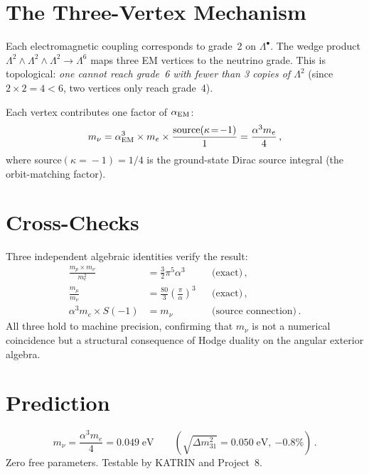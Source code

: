 \documentclass[11pt,letterpaper]{article}
\numberwithin{equation}{section}
\begin{document}
\section{The Three-Vertex Mechanism}

Each electromagnetic coupling corresponds to grade~2 on
$\Lambda^\bullet$.  The wedge product
$\Lambda^2 \wedge \Lambda^2 \wedge \Lambda^2 \to \Lambda^6$ maps
three EM vertices to the neutrino grade.  This is topological:
\emph{one cannot reach grade~6 with fewer than 3 copies of
$\Lambda^2$} (since $2 \times 2 = 4 < 6$, two vertices only reach
grade~4).

Each vertex contributes one factor of $\alpha_{\rm EM}$:
\begin{equation}
  m_\nu = \alpha_{\rm EM}^3 \times m_e \times
  \frac{\text{source}(\kappa\!=\!-1)}{1}
  = \frac{\alpha^3 m_e}{4}\,,
\end{equation}
where source$(\kappa\!=\!-1) = 1/4$ is the ground-state Dirac source
integral (the orbit-matching factor).

\section{Cross-Checks}

Three independent algebraic identities verify the result:
\begin{align}
  \frac{m_p \times m_\nu}{m_e^2}
  &= \frac{3}{2}\pi^5 \alpha^3 &&\text{(exact)}\,,\\
  \frac{m_\mu}{m_\nu}
  &= \frac{80}{3}\left(\frac{\pi}{\alpha}\right)^{\!3}
  &&\text{(exact)}\,,\\
  \alpha^3 m_e \times S(-1)
  &= m_\nu &&\text{(source connection)}\,.
\end{align}
All three hold to machine precision, confirming that $m_\nu$ is not a
numerical coincidence but a structural consequence of Hodge duality on
the angular exterior algebra.

\section{Prediction}

\begin{equation}
  m_\nu = \frac{\alpha^3 m_e}{4} = 0.049\;\text{eV}
  \qquad(\sqrt{\Delta m^2_{31}} = 0.050\;\text{eV},\ {-0.8\%})\,.
\end{equation}
Zero free parameters.  Testable by KATRIN and Project~8.
\end{document}
